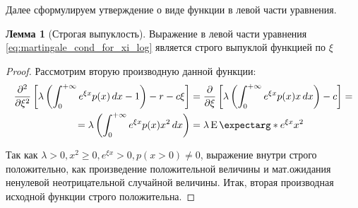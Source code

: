 \documentclass[a4paper,12pt]{article}
\theoremstyle{definition}
\newtheorem{lemma}{Лемма}
\newcommand{\expect}{\operatorname{E}\expectarg}
\begin{document}
Далее сформулируем утверждение о виде функции в левой части уравнения.
\begin{lemma}[Строгая выпуклость]\label{thm:strict_convexity_m1}
Выражение в левой части уравнения \eqref{eq:martingale_cond_for_xi_log} является строго выпуклой функцией по $\xi$
\end{lemma}
\begin{proof}
Рассмотрим вторую производную данной функции:
\begin{equation*}
\begin{split}
     \pdv[2]{}{\xi} \left[\lambda \left(\int_{0}^{+\infty} e^{\xi x} p(x) \,dx - 1\right) - r - c\xi \right] &= \pdv{}{\xi} \left[\lambda \left(\int_{0}^{+\infty} e^{\xi x} p(x) x \,dx \right) - c \right] =\\
     = \lambda \left(\int_{0}^{+\infty} e^{\xi x} p(x) x^{2} \,dx \right) &= \lambda \expect*{e^{\xi x} x^2}
\end{split}
\end{equation*}

Так как $\lambda > 0, x^2 \ge 0, e^{\xi x} > 0, p(x > 0) \neq 0$, выражение внутри строго положительно, как произведение положительной величины и мат.ожидания ненулевой неотрицательной случайной величины. Итак, вторая производная исходной функции строго положительна.

\end{proof}
\end{document}
